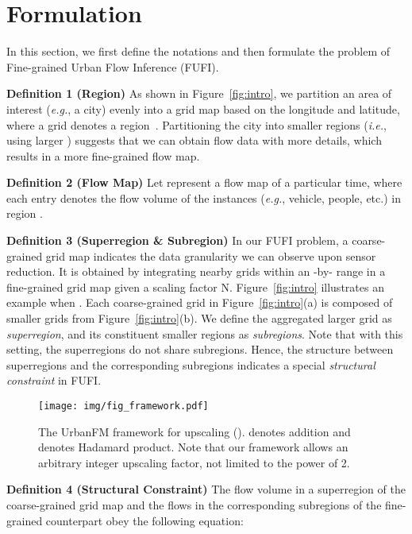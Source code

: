 \section{Formulation}\label{sec:form}
In this section, we first define the notations and then formulate the problem of Fine-grained Urban Flow Inference (FUFI).

\noindent\textbf{Definition 1 (Region)} As shown in Figure~\ref{fig:intro}, we partition an area of interest (\emph{e.g.}, a city) evenly into a  grid map based on the longitude and latitude, where a grid denotes a region~\cite{zhang2017deep}. Partitioning the city into smaller regions (\emph{i.e.}, using larger ) suggests that we can obtain flow data with more details, which results in a more fine-grained flow map.

\noindent\textbf{Definition 2 (Flow Map)} Let  represent a flow map of a particular time, where each entry  denotes the flow volume of the instances (\emph{e.g.}, vehicle, people, etc.) in region .

\noindent\textbf{Definition 3 (Superregion \& Subregion)} In our FUFI problem, a coarse-grained grid map indicates the data granularity  we can observe upon sensor reduction. It is obtained by integrating nearby grids within an -by- range in a fine-grained grid map given a scaling factor N. Figure~\ref{fig:intro} illustrates an example when . Each coarse-grained grid in Figure~\ref{fig:intro}(a) is composed of  smaller grids from Figure~\ref{fig:intro}(b). We define the aggregated larger grid as \textit{superregion}, and its constituent smaller regions as \textit{subregions}. Note that with this setting, the superregions do not share subregions. Hence, the structure between superregions and the corresponding subregions indicates a special \textit{structural constraint} in FUFI.


\begin{figure*}[!t]
	\centering
	\texttt{[image: img/fig\_framework.pdf]}
	\vspace{-1em}
	\caption{\label{fig:framework}The UrbanFM framework for  upscaling ().  denotes addition and  denotes Hadamard product. Note that our framework allows an arbitrary integer upscaling factor, not limited to the power of 2.}
	\vspace{-1em}
\end{figure*}

\noindent\textbf{Definition 4 (Structural Constraint)} The flow volume  in a superregion of the coarse-grained grid map and the flows  in the corresponding subregions of the fine-grained counterpart obey the following equation:
\iffalse


